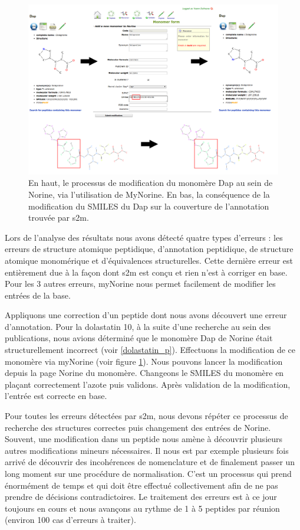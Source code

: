 \begin{figure}[h!]
  \begin{center}
    \includegraphics[width=450px]{Figures/contributions/dap_modif.png}
    \caption{\label{dap_modif}En haut, le processus de modification du monomère Dap au sein de Norine, via l'utilisation de MyNorine.
    En bas, la conséquence de la modification du SMILES du Dap sur la couverture de l'annotation trouvée par s2m.}
  \end{center}
\end{figure}

Lors de l'analyse des résultats nous avons détecté quatre types d'erreurs : les erreurs de structure atomique peptidique, d'annotation peptidique, de structure atomique monomérique et d'équivalences structurelles.
Cette dernière erreur est entièrement due à la façon dont s2m est conçu et rien n'est à corriger en base.
Pour les 3 autres erreurs, myNorine nous permet facilement de modifier les entrées de la base.

Appliquons une correction d'un peptide dont nous avons découvert une erreur d'annotation.
Pour la dolastatin 10, à la suite d'une recherche au sein des publications, nous avions déterminé que le monomère Dap de Norine était structurellement incorrect (voir \ref{dolastatin_p}).
Effectuons la modification de ce monomère via myNorine (voir figure \ref{dap_modif}).
Nous pouvons lancer la modification depuis la page Norine du monomère.
Changeons le SMILES du monomère en plaçant correctement l'azote puis validons.
Après validation de la modification, l'entrée est correcte en base.

Pour toutes les erreurs détectées par s2m, nous devons répéter ce processus de recherche des structures correctes puis changement des entrées de Norine.
Souvent, une modification dans un peptide nous amène à découvrir plusieurs autres modifications mineurs nécessaires.
Il nous est par exemple plusieurs fois arrivé de découvrir des incohérences de nomenclature et de finalement passer un long moment sur une procédure de normalisation.
C'est un processus qui prend énormément de temps et qui doit être effectué collectivement afin de ne pas prendre de décisions contradictoires.
Le traitement des erreurs est à ce jour toujours en cours et nous avançons au rythme de 1 à 5 peptides par réunion (environ 100 cas d'erreurs à traiter).


